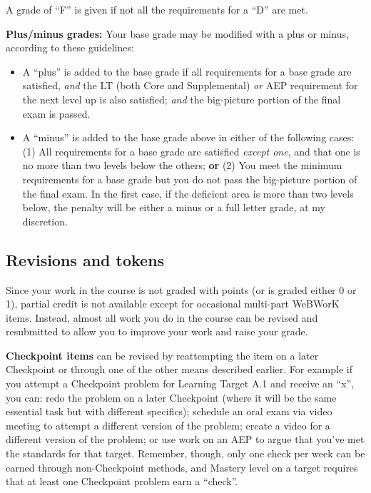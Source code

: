 \documentclass[]{article}
\providecommand{\tightlist}{%
  \setlength{\itemsep}{0pt}\setlength{\parskip}{0pt}}
\begin{document}
A grade of ``F'' is given if not all the requirements for a ``D'' are
met.

\textbf{Plus/minus grades:} Your base grade may be modified with a plus
or minus, according to these guidelines:

\begin{itemize}
\tightlist
\item
  A ``plus'' is added to the base grade if all requirements for a base
  grade are satisfied, \emph{and} the LT (both Core and Supplemental)
  \emph{or} AEP requirement for the next level up is also satisfied;
  \emph{and} the big-picture portion of the final exam is passed.
\item
  A ``minus'' is added to the base grade above in either of the
  following cases: (1) All requirements for a base grade are satisfied
  \emph{except one}, and that one is no more than two levels below the
  others; \textbf{or} (2) You meet the minimum requirements for a base
  grade but you do not pass the big-picture portion of the final exam.
  In the first case, if the deficient area is more than two levels
  below, the penalty will be either a minus or a full letter grade, at
  my discretion.
\end{itemize}

\hypertarget{revisions-and-tokens}{%
\subsection{Revisions and tokens}\label{revisions-and-tokens}}

Since your work in the course is not graded with points (or is graded
either 0 or 1), partial credit is not available except for occasional
multi-part WeBWorK items. Instead, almost all work you do in the course
can be revised and resubmitted to allow you to improve your work and
raise your grade.

\textbf{Checkpoint items} can be revised by reattempting the item on a
later Checkpoint or through one of the other means described earlier.
For example if you attempt a Checkpoint problem for Learning Target A.1
and receive an ``x'', you can: redo the problem on a later Checkpoint
(where it will be the same essential task but with different specifics);
schedule an oral exam via video meeting to attempt a different version
of the problem; create a video for a different version of the problem;
or use work on an AEP to argue that you've met the standards for that
target. Remember, though, only one check per week can be earned through
non-Checkpoint methods, and Mastery level on a target requires that at
least one Checkpoint problem earn a ``check''.
\end{document}
